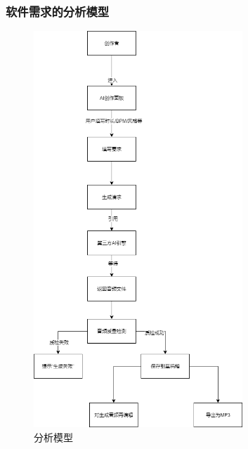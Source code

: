 \documentclass{base}
\numberwithin{figure}{section} %
\begin{document}
\subsubsection{软件需求的分析模型}

\begin{figure}[H]
    \centering
    \includegraphics[width=0.7\textwidth]{images/4-1.png}
    \caption{分析模型}
\end{figure}
\end{document}
